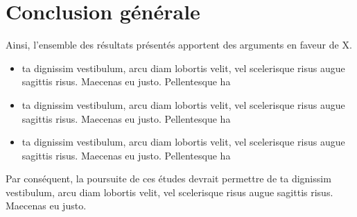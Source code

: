 \chapter{Conclusion générale} %
 



\lipsum[40]

\lipsum[70]





\vspace{13pt}

Ainsi, l’ensemble des résultats présentés apportent des arguments en faveur de X.
\begin{itemize}[label=\textbullet]%
        \item ta dignissim vestibulum, arcu diam lobortis velit, vel scelerisque risus augue sagittis risus. Maecenas eu justo. Pellentesque ha
        \item ta dignissim vestibulum, arcu diam lobortis velit, vel scelerisque risus augue sagittis risus. Maecenas eu justo. Pellentesque ha
        \item ta dignissim vestibulum, arcu diam lobortis velit, vel scelerisque risus augue sagittis risus. Maecenas eu justo. Pellentesque ha
\end{itemize}

\vspace{13pt}

Par conséquent, la poursuite de ces études devrait permettre de ta dignissim vestibulum, arcu diam lobortis velit, vel scelerisque risus augue sagittis risus. Maecenas eu justo.

